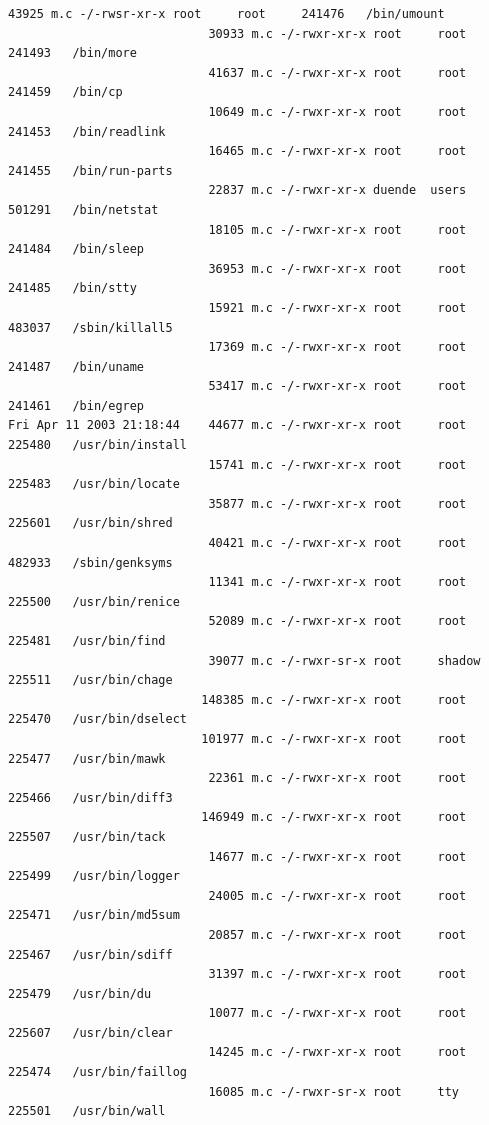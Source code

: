 {\begin{lstlisting}[style=terminal]
                            43925 m.c -/-rwsr-xr-x root     root     241476   /bin/umount
                            30933 m.c -/-rwxr-xr-x root     root     241493   /bin/more
                            41637 m.c -/-rwxr-xr-x root     root     241459   /bin/cp
                            10649 m.c -/-rwxr-xr-x root     root     241453   /bin/readlink
                            16465 m.c -/-rwxr-xr-x root     root     241455   /bin/run-parts
                            22837 m.c -/-rwxr-xr-x duende  users    501291   /bin/netstat
                            18105 m.c -/-rwxr-xr-x root     root     241484   /bin/sleep
                            36953 m.c -/-rwxr-xr-x root     root     241485   /bin/stty
                            15921 m.c -/-rwxr-xr-x root     root     483037   /sbin/killall5
                            17369 m.c -/-rwxr-xr-x root     root     241487   /bin/uname
                            53417 m.c -/-rwxr-xr-x root     root     241461   /bin/egrep
Fri Apr 11 2003 21:18:44    44677 m.c -/-rwxr-xr-x root     root     225480   /usr/bin/install
                            15741 m.c -/-rwxr-xr-x root     root     225483   /usr/bin/locate
                            35877 m.c -/-rwxr-xr-x root     root     225601   /usr/bin/shred
                            40421 m.c -/-rwxr-xr-x root     root     482933   /sbin/genksyms
                            11341 m.c -/-rwxr-xr-x root     root     225500   /usr/bin/renice
                            52089 m.c -/-rwxr-xr-x root     root     225481   /usr/bin/find
                            39077 m.c -/-rwxr-sr-x root     shadow   225511   /usr/bin/chage
                           148385 m.c -/-rwxr-xr-x root     root     225470   /usr/bin/dselect
                           101977 m.c -/-rwxr-xr-x root     root     225477   /usr/bin/mawk
                            22361 m.c -/-rwxr-xr-x root     root     225466   /usr/bin/diff3
                           146949 m.c -/-rwxr-xr-x root     root     225507   /usr/bin/tack
                            14677 m.c -/-rwxr-xr-x root     root     225499   /usr/bin/logger
                            24005 m.c -/-rwxr-xr-x root     root     225471   /usr/bin/md5sum
                            20857 m.c -/-rwxr-xr-x root     root     225467   /usr/bin/sdiff
                            31397 m.c -/-rwxr-xr-x root     root     225479   /usr/bin/du
                            10077 m.c -/-rwxr-xr-x root     root     225607   /usr/bin/clear
                            14245 m.c -/-rwxr-xr-x root     root     225474   /usr/bin/faillog
                            16085 m.c -/-rwxr-sr-x root     tty      225501   /usr/bin/wall

\end{lstlisting}}
